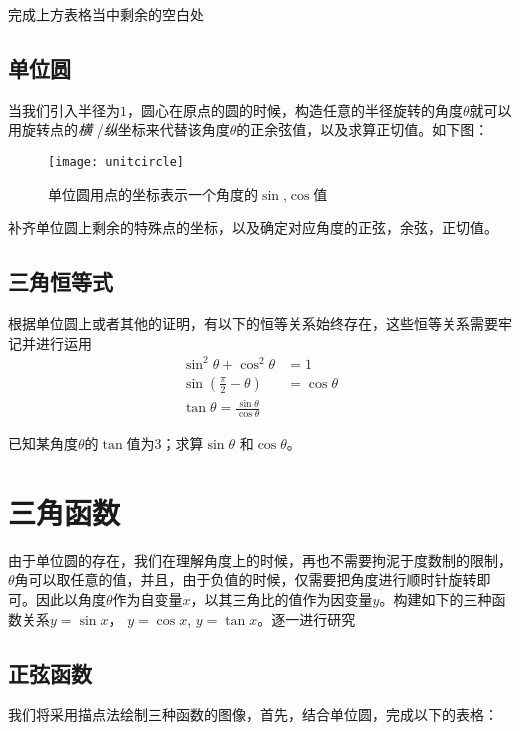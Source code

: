 \begin{TaskBox}
完成上方表格当中剩余的空白处
\end{TaskBox}


\subsection*{单位圆}
\label{subsec:Unit Circle}
当我们引入半径为$1$，圆心在原点的圆的时候，构造任意的半径旋转的角度$\theta$就可以用旋转点的\emph{横}
/\emph{纵}坐标来代替该角度$\theta$的正余弦值，以及求算正切值。如下图：

\begin{figure}[H]
\centering
\texttt{[image: unitcircle]}
\caption{单位圆用点的坐标表示一个角度的$\sin$,$\cos$值}
\end{figure}

\begin{TaskBox}
补齐单位圆上剩余的特殊点的坐标，以及确定对应角度的正弦，余弦，正切值。
\end{TaskBox}

\subsection*{三角恒等式}
\label{subsec:Trig Identity}
根据单位圆上或者其他的证明，有以下的恒等关系始终存在，这些恒等关系需要牢记并进行运用
\begin{align}
\sin^2\theta+\cos^2\theta &= 1\\
\sin(\frac{\pi}{2}-\theta) &= \cos \theta \\
\tan \theta =\frac{\sin \theta}{\cos \theta}
\end{align}

\begin{TaskBox}
已知某角度$\theta$的$\tan$值为3；求算$\sin \theta$ 和$\cos \theta$。
\end{TaskBox}
\clearpage


\section{三角函数}
\label{sec:Unit Circle and Trigonometric Function}
由于单位圆的存在，我们在理解角度上的时候，再也不需要拘泥于度数制的限制，$\theta$角可以取任意的值，并且，由于负值的时候，仅需要把角度进行顺时针旋转即可。因此以角度$\theta$作为自变量$x$，以其三角比的值作为因变量$y$。构建如下的三种函数关系$y=\sin x$， $y=\cos x$, $y=\tan x$。逐一进行研究

\subsection*{正弦函数}
\label{subsec:Sine function}
我们将采用描点法绘制三种函数的图像，首先，结合单位圆，完成以下的表格：

